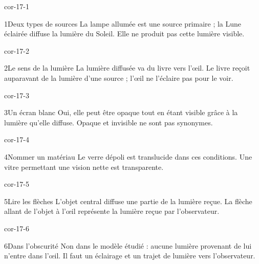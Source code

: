 \documentclass[12pt,twoside,openany]{book}
\begin{document}
\clearpage{}
\begin{blocLivre}{cor-17-1}
\begin{corrige}{1}{Deux types de sources}
La lampe allumée est une source primaire ; la Lune éclairée diffuse la lumière du Soleil. Elle ne produit pas cette lumière visible.\par
\end{corrige}\end{blocLivre}
\begin{blocLivre}{cor-17-2}
\begin{corrige}{2}{Le sens de la lumière}
La lumière diffusée va du livre vers l’œil. Le livre reçoit auparavant de la lumière d’une source ; l’œil ne l’éclaire pas pour le voir.\par
\end{corrige}\end{blocLivre}
\begin{blocLivre}{cor-17-3}
\begin{corrige}{3}{Un écran blanc}
Oui, elle peut être opaque tout en étant visible grâce à la lumière qu’elle diffuse. Opaque et invisible ne sont pas synonymes.\par
\end{corrige}\end{blocLivre}
\begin{blocLivre}{cor-17-4}
\begin{corrige}{4}{Nommer un matériau}
Le verre dépoli est translucide dans ces conditions. Une vitre permettant une vision nette est transparente.\par
\end{corrige}\end{blocLivre}
\begin{blocLivre}{cor-17-5}
\begin{corrige}{5}{Lire les flèches}
L’objet central diffuse une partie de la lumière reçue. La flèche allant de l’objet à l’œil représente la lumière reçue par l’observateur.\par
{}
\end{corrige}\end{blocLivre}
\begin{blocLivre}{cor-17-6}
\begin{corrige}{6}{Dans l’obscurité}
Non dans le modèle étudié : aucune lumière provenant de lui n’entre dans l’œil. Il faut un éclairage et un trajet de lumière vers l’observateur.\par
\end{corrige}\end{blocLivre}
\end{document}
